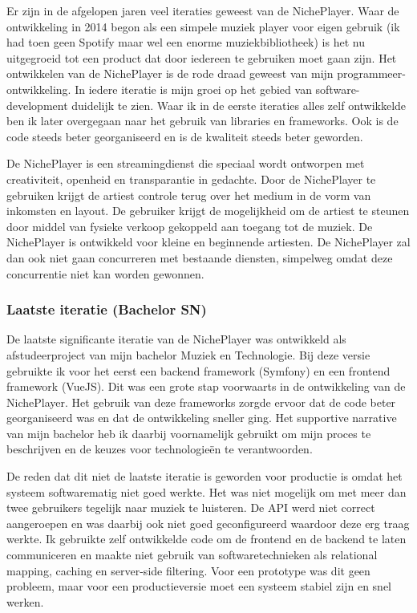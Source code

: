 Er zijn in de afgelopen jaren veel iteraties geweest van de NichePlayer. Waar de ontwikkeling in 2014 begon als een simpele muziek player voor eigen gebruik (ik had toen geen Spotify maar wel een enorme muziekbibliotheek) is het nu uitgegroeid tot een product dat door iedereen te gebruiken moet gaan zijn. Het ontwikkelen van de NichePlayer is de rode draad geweest van mijn programmeer-ontwikkeling. In iedere iteratie is mijn groei op het gebied van software-development duidelijk te zien. Waar ik in de eerste iteraties alles zelf ontwikkelde ben ik later overgegaan naar het gebruik van libraries en frameworks. Ook is de code steeds beter georganiseerd en is de kwaliteit steeds beter geworden.

De NichePlayer is een streamingdienst die speciaal wordt ontworpen met creativiteit, openheid en transparantie in gedachte. Door de NichePlayer te gebruiken krijgt de artiest controle terug over het medium in de vorm van inkomsten en layout. De gebruiker krijgt de mogelijkheid om de artiest te steunen door middel van fysieke verkoop gekoppeld aan toegang tot de muziek. 
De NichePlayer is ontwikkeld voor kleine en beginnende artiesten. De NichePlayer zal dan ook niet gaan concurreren met bestaande diensten, simpelweg omdat deze concurrentie niet kan worden gewonnen.

\subsubsection*{Laatste iteratie (Bachelor SN)}
De laatste significante iteratie van de NichePlayer was ontwikkeld als afstudeerproject van mijn bachelor Muziek en Technologie. Bij deze versie gebruikte ik voor het eerst een backend framework (Symfony) en een frontend framework (VueJS). Dit was een grote stap voorwaarts in de ontwikkeling van de NichePlayer. Het gebruik van deze frameworks zorgde ervoor dat de code beter georganiseerd was en dat de ontwikkeling sneller ging. Het supportive narrative van mijn bachelor heb ik daarbij voornamelijk gebruikt om mijn proces te beschrijven en de keuzes voor technologieën te verantwoorden.

De reden dat dit niet de laatste iteratie is geworden voor productie is omdat het systeem softwarematig niet goed werkte. Het was niet mogelijk om met meer dan twee gebruikers tegelijk naar muziek te luisteren. De API werd niet correct aangeroepen en was daarbij ook niet goed geconfigureerd waardoor deze erg traag werkte. Ik gebruikte zelf ontwikkelde code om de frontend en de backend te laten communiceren en maakte niet gebruik van softwaretechnieken als relational mapping, caching en server-side filtering. Voor een prototype was dit geen probleem, maar voor een productieversie moet een systeem stabiel zijn en snel werken.

